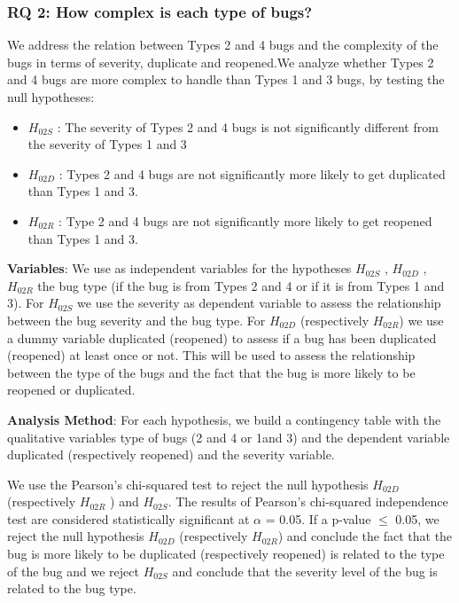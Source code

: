 \subsubsection{RQ 2: How complex is each type of bugs?}

We address the relation between Types 2 and 4 bugs and
the complexity of the bugs in terms of severity, duplicate and
reopened.We analyze whether Types 2 and 4 bugs are more
complex to handle than Types 1 and 3 bugs, by testing the
null hypotheses:

\begin{itemize}
 \item  $H_{02S}$ : The severity of Types 2 and 4 bugs is not
significantly different from the severity of Types 1 and 3
 \item  $H_{02D}$ : Types 2 and 4 bugs are not significantly more
likely to get duplicated than Types 1 and 3.
 \item  $H_{02R}$ : Type 2 and 4 bugs are not significantly more
likely to get reopened than Types 1 and 3.
\end{itemize}

{\bf Variables}: We use as independent variables for the
hypotheses $H_{02S}$ , $H_{02D}$ , $H_{02R}$ the bug type (if the bug is from
Types 2 and 4 or if it is from Types 1 and 3). For $H_{02S}$  we use
the severity as dependent variable to assess the relationship
between the bug severity and the bug type. For $H_{02D}$
(respectively $H_{02R}$) we use a dummy variable duplicated
(reopened) to assess if a bug has been duplicated (reopened)
at least once or not. This will be used to assess the
relationship between the type of the bugs and the fact that the
bug is more likely to be reopened or duplicated.

{\bf Analysis Method}: For each hypothesis, we build a
contingency table with the qualitative variables type of bugs
(2 and 4 or 1and 3) and the dependent variable duplicated
(respectively reopened) and the severity variable.

We use the Pearson’s chi-squared test to reject the null
hypothesis $H_{02D}$ (respectively $H_{02R}$ ) and $H_{02S}$. The results of
Pearson’s chi-squared independence test are considered
statistically significant at $\alpha$ = 0.05. If a p-value $\le$ 0.05, we
reject the null hypothesis  $H_{02D}$ (respectively $H_{02R}$) and
conclude the fact that the bug is more likely to be duplicated
(respectively reopened) is related to the type of the bug and
we reject $H_{02S}$ and conclude that the severity level of the bug
is related to the bug type.

